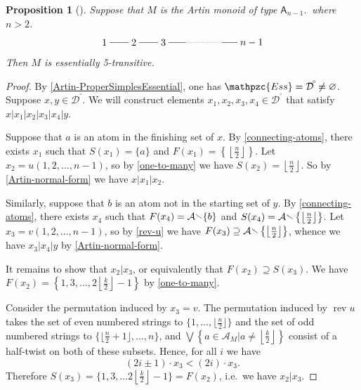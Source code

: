 \documentclass[a4paper,final]{article}
\let\emptyset\varnothing
\theoremstyle{plain}
\newtheorem{proposition}[proposition]{Proposition}
\theoremstyle{remark}
\theoremstyle{definition}
\begin{document}
\begin{proposition}[\cite{Caruso13}] \label{type-A-ess-trans}
  Suppose that $M$ is the Artin monoid of type ${\mathsf{{A}}}_{n-1}$.\, where $n>2$.
  \[
    \begin{xy}
      0;<3em,0em>:<0em,3em>::
      
      (1,0)*+{1}="1";
      (2,0)*+{2}="2";
      (3,0)*+{3}="3";
      (3.75,0)="4";
      (5,0)="5";
      (6,0)*+{n-1}="6";
      
      {\ar@{-}     "1";"2"};
      {\ar@{-}     "2";"3"};
      {\ar@{-}     "3";"4"};
      {\ar@{..}    "4";"5"};
      {\ar@{-}     "5";"6"};
    \end{xy}
  \]
  Then $M$ is essentially 5-transitive.
\end{proposition}
\begin{proof}
  By \autoref{Artin-ProperSimplesEssential}, one has ${\mathpzc{Ess}}={{\mathcal{D}}^{\!{}^{\circ}\!}}\neq\emptyset$.
  Suppose $x, y \in {{\mathcal{D}}^{\!{}^{\circ}\!}}$.  We will construct elements $x_1, x_2,
  x_3, x_4 \in {{\mathcal{D}}^{\!{}^{\circ}\!}}$ that satisfy $x|x_1|x_2|x_3|x_4|y$.

  Suppose that $a$ is an atom in the finishing set of $x$.  By
  \autoref{connecting-atoms}, there exists $x_1$ such that
  ${S}(x_1) = \{ a \}$ and ${F}(x_1) =
  \left\{\left\lfloor\frac{n}{2}\right\rfloor\right\}$.  Let $x_2 = u(1,2,\ldots,n-1)$,
  so by \autoref{one-to-many} we have ${S}(x_2) =
  \left\lfloor\frac{n}{2}\right\rfloor$.  So by
  \autoref{Artin-normal-form} we have $x|x_1|x_2$.

  Similarly, suppose that $b$ is an atom not in the starting set of
  $y$.  By \autoref{connecting-atoms}, there exists $x_4$ such that
  ${F}(x_4) = {\mathcal{A}} {\mathbin{\raisebox{0.25ex}{$\smallsetminus$}}} \{b\}$ and ${S}(x_4) = {\mathcal{A}}
  {\mathbin{\raisebox{0.25ex}{$\smallsetminus$}}} \left\{\left\lfloor\frac{n}{2}\right\rfloor\right\}$.  Let
  $x_3 = v(1,2,\ldots,n-1)$, so by \autoref{rev-u} we have
  ${F}(x_3)\supseteq{\mathcal{A}}{\mathbin{\raisebox{0.25ex}{$\smallsetminus$}}}\left\{\left\lfloor\frac{n}{2}\right\rfloor\right\}$, whence
  we have $x_3|x_4|y$ by \autoref{Artin-normal-form}.

  It remains to show that $x_2|x_3$, or equivalently that ${F}(x_2)
  \supseteq {S}(x_3)$.  We have ${F}(x_2) =
  \left\{1,3,\ldots,2\left\lfloor\frac{k}{2}\right\rfloor-1\right\}$ by \autoref{one-to-many}.
  
  Consider the permutation induced by $x_3=v$.  The permutation
  induced by $\operatorname{rev} u$ takes the set of even numbered strings to
  $\{1,\ldots,\lfloor\frac{n}{2}\rfloor\}$ and the set of odd numbered
  strings to $\{\lfloor\frac{n}{2}+1\rfloor,\ldots,n\}$, and
  ${\bigvee}\left\{ a \in {\mathcal{A}}_M | a \ne
    \left\lfloor\frac{k}{2}\right\rfloor\right\}$ consist of a
  half-twist on both of these subsets.  Hence, for all $i$ we
  have
  \[ (2i\pm 1)\cdot x_3 < (2i)\cdot x_3. \]
  Therefore ${S}(x_3) = \{ 1, 3, \ldots
  2\left\lfloor\frac{k}{2}\right\rfloor - 1\} = {F}(x_2)$, i.e.\ we
  have $x_2|x_3$.
\end{proof}
\end{document}
